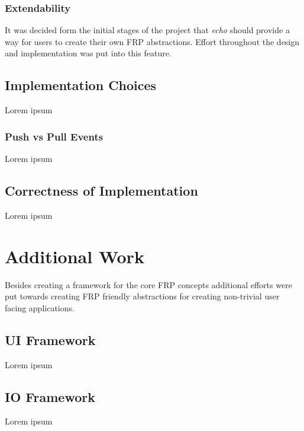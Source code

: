 \documentclass[12pt]{article}
\begin{document}
      \subsubsection{Extendability}
        It was decided form the initial stages of the project that \emph{echo} should provide
        a way for users to create their own FRP abstractions. Effort throughout the design and
        implementation was put into this feature.
        
      
    \subsection{Implementation Choices}
      Lorem ipsum
      
      \subsubsection{Push vs Pull Events}
        Lorem ipsum
        
    
    \subsection{Correctness of Implementation}
      Lorem ipsum 
      
      
  \section{Additional Work}
    Besides creating a framework for the core FRP concepts additional efforts
    were put towards creating FRP friendly abstractions for creating non-trivial user facing
    applications.
    
    \subsection{UI Framework}
    Lorem ipsum
    
    \subsection{IO Framework}
    Lorem ipsum
    
\end{document}
